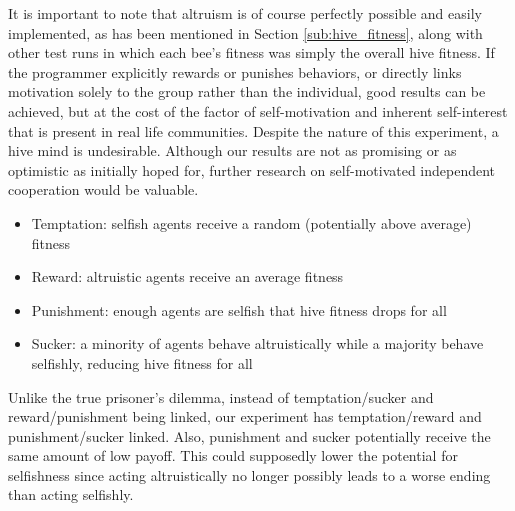 \documentclass[twoside]{article}
\begin{document}
\begin{multicols}{2}
		It is important to note that altruism is of course perfectly possible and easily implemented, as has been mentioned in Section \ref{sub:hive_fitness}, along with other test runs in which each bee's fitness was simply the overall hive fitness. If the programmer explicitly rewards or punishes behaviors, or directly links motivation solely to the group rather than the individual, good results can be achieved, but at the cost of the factor of self-motivation and inherent self-interest that is present in real life communities. Despite the nature of this experiment, a hive mind is undesirable. Although our results are not as promising or as optimistic as initially hoped for, further research on self-motivated independent cooperation would be valuable. 

		\begin{itemize}
		\item Temptation: selfish agents receive a random (potentially above average) fitness
		\item Reward: altruistic agents receive an average fitness
		\item Punishment: enough agents are selfish that hive fitness drops for all
		\item Sucker: a minority of agents behave altruistically while a majority behave selfishly, reducing hive fitness for all
		\end{itemize}
		Unlike the true prisoner's dilemma, instead of temptation/sucker and reward/punishment being linked, our experiment has temptation/reward and punishment/sucker linked. Also, punishment and sucker potentially receive the same amount of low payoff. This could supposedly lower the potential for selfishness since acting altruistically no longer possibly leads to a worse ending than acting selfishly.



	\nocite{*}
	
	
\end{multicols}
\end{document}

